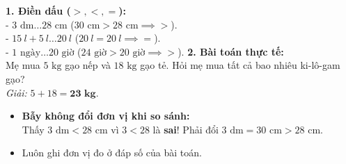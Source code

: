 \documentclass[11pt,a4paper]{article}
\begin{document}
\vspace{-1.5mm}
\noindent
\begin{minipage}[t]{0.49\textwidth}\vspace{0pt}
\begin{tcolorbox}[
  enhanced,
  colback=green!4!white,
  colframe=green!60!black,
  arc=2mm, boxrule=0.8pt,
  left=2mm, right=2mm, top=1.8mm, bottom=1.8mm,
  title={\footnotesize\bfseries\color{white}\faCheckCircle\ 4. Ví dụ thực hành chuẩn mực}
]
{\footnotesize
\textbf{1. Điền dấu ($>, <, =$):}\\
- $3\text{ dm} \dots 28\text{ cm}$ ($30\text{ cm} > 28\text{ cm} \implies >$).\\
- $15\ l + 5\ l \dots 20\ l$ ($20\ l = 20\ l \implies =$).\\
- $1\text{ ngày} \dots 20\text{ giờ}$ ($24\text{ giờ} > 20\text{ giờ} \implies >$).
\textbf{2. Bài toán thực tế:}\\
Mẹ mua $5\text{ kg}$ gạo nếp và $18\text{ kg}$ gạo tẻ. Hỏi mẹ mua tất cả bao nhiêu ki-lô-gam gạo?\\
\textit{Giải:} $5 + 18 = \mathbf{23\text{ kg}}$.
}
\end{tcolorbox}
\end{minipage}
\hfill
\begin{minipage}[t]{0.49\textwidth}\vspace{0pt}
\begin{tcolorbox}[
  enhanced,
  colback=red!4!white,
  colframe=red!75!black,
  arc=2mm, boxrule=0.8pt,
  left=2mm, right=2mm, top=1.8mm, bottom=1.8mm,
  title={\footnotesize\bfseries\color{white}\faExclamationTriangle\ 5. Mẹo tránh bẫy trắc nghiệm}
]
{\footnotesize
\begin{itemize}\setlength{\itemsep}{1pt}\setlength{\leftskip}{-2.5mm}
  \item \textbf{Bẫy không đổi đơn vị khi so sánh:}\\
  Thấy $3\text{ dm} < 28\text{ cm}$ vì $3 < 28$ là \textbf{sai}! Phải đổi $3\text{ dm} = 30\text{ cm} > 28\text{ cm}$.
  \item Luôn ghi đơn vị đo ở đáp số của bài toán.
\end{itemize}
}
\end{tcolorbox}
\end{minipage}
\end{document}
